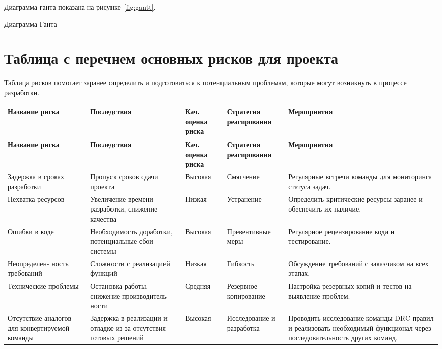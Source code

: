 Диаграмма ганта показана на рисунке~\ref{fig:gantt}.

\begin{image}
	\caption{Диаграмма Ганта}
	\label{fig:gantt}
\end{image}

\section{Таблица с перечнем основных рисков для проекта}

Таблица рисков помогает заранее определить
и подготовиться к потенциальным проблемам,
которые могут возникнуть в процессе разработки.

\begin{longtable}{|p{3.2cm}|p{3.2cm}|p{2cm}|p{3cm}|p{4cm}|}
	\hline
	\textbf{Название риска}
	& \textbf{Последствия}
	& \textbf{Кач. оценка риска}
	& \textbf{Стратегия реагирования}
	& \textbf{Мероприятия} \\ \hline
	\endfirsthead
	\hline
	\textbf{Название риска}
	& \textbf{Последствия}
	& \textbf{Кач. оценка риска}
	& \textbf{Стратегия реагирования}
	& \textbf{Мероприятия} \\ \hline
	\endhead
	Задержка в сроках разработки
	& Пропуск сроков сдачи проекта
	& Высокая
	& Смягчение 
	& Регулярные встречи команды для мониторинга статуса задач. \\ \hline
	Нехватка ресурсов
	& Увеличение времени разработки, снижение качества
	& Низкая
	& Устранение
	& Определить критические ресурсы заранее и обеспечить их наличие. \\ \hline
	Ошибки в коде
	& Необходимость доработки, потенциальные сбои системы
	& Высокая
	& Превентивные меры
	& Регулярное рецензирование кода и тестирование. \\ \hline
	Неопределен- ность требований
	& Сложности с реализацией функций
	& Низкая
	& Гибкость
	& Обсуждение требований с заказчиком на всех этапах. \\ \hline
	Технические проблемы
	& Остановка работы, снижение производитель- ности
	& Средняя
	& Резервное копирование
	& Настройка резервных копий и тестов на выявление проблем. \\ \hline
	Отсутствие аналогов для конвертируемой команды
	& Задержка в реализации и отладке из-за отсутствия готовых решений
	& Высокая
	& Исследование и разработка
	& Проводить исследование команды DRC правил
	и реализовать необходимый функционал через последовательность
	других команд. \\ \hline
\end{longtable}


